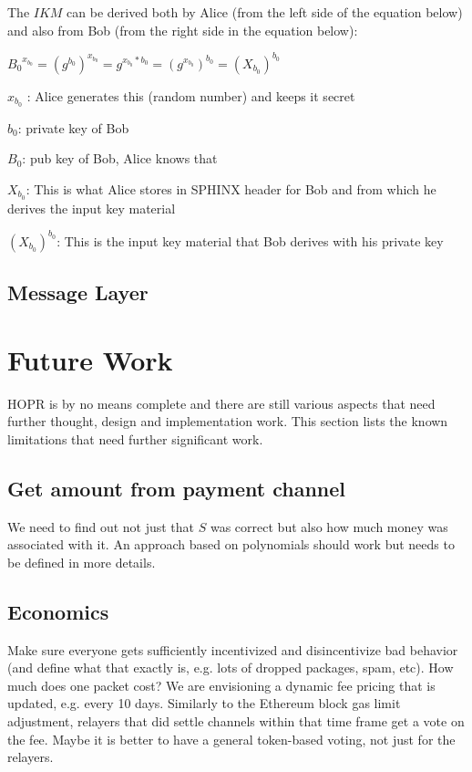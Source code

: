 \documentclass{article}
\begin{document}
The $IKM$ can be derived both by Alice (from the left side of the equation below) and also from Bob (from the right side in the equation below):

${B_0}^{x_{b_0}} = (g^{b_0})^{x_{b_0}} = g^{x_{b_0} * b_0} = (g^{x_{b_0}})^{b_0} = (X_{b_0})^{b_0}$

$x_{b_0}$ : Alice generates this (random number) and keeps it secret

$b_0$: private key of Bob

$B_0$: pub key of Bob, Alice knows that

$X_{b_0}$: This is what Alice stores in SPHINX header for Bob and from which he derives the input key material

$(X_{b_0})^{b_0}$: This is the input key material that Bob derives with his private key


\subsection{Message Layer}

\section{Future Work}
HOPR is by no means complete and there are still various aspects that need further thought, design and implementation work. This section lists the known limitations that need further significant work.

\subsection{Get amount from payment channel}
We need to find out not just that $S$ was correct but also how much money was associated with it. An approach based on polynomials should work but needs to be defined in more details. 

\subsection{Economics}
Make sure everyone gets sufficiently incentivized and disincentivize bad behavior (and define what that exactly is, e.g. lots of dropped packages, spam, etc). How much does one packet cost? We are envisioning a dynamic fee pricing that is updated, e.g. every 10 days. Similarly to the Ethereum block gas limit adjustment, relayers that did settle channels within that time frame get a vote on the fee. Maybe it is better to have a general token-based voting, not just for the relayers.
\end{document}
